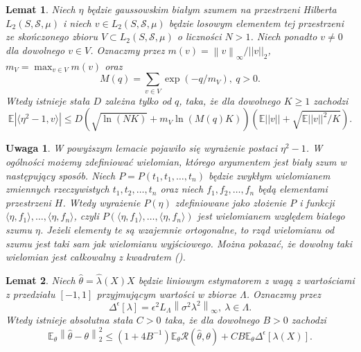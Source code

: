 \documentclass{article}
\newtheorem{lm}{Lemat}
\newtheorem{uw}{Uwaga}
\newcommand{\norm}[1]{\left\lVert#1\right\rVert}
\begin{document}
\begin{lm}\label{lem5}
Niech $\eta$ będzie gaussowskim białym szumem na przestrzeni Hilberta $L_2(S,\mathcal{S},\mu)$ i niech $v\in L_2(S,\mathcal{S},\mu)$ będzie losowym elementem tej przestrzeni ze skończonego zbioru $V\subset L_2(S,\mathcal{S},\mu)$ o liczności $N>1$. Niech ponadto $v\neq 0$ dla dowolnego $v\in V$. Oznaczmy przez $m(v)=\norm{v}_{\infty}/||v||_2$, $m_V=\max_{v\in V}m(v)$ oraz 
\begin{displaymath}
M(q)=\sum_{v\in V}\exp (-q/m_V),\ q>0.
\end{displaymath}
Wtedy istnieje stała $D$ zależna tylko od $q$, taka, że dla dowolnego $K\geq 1$ zachodzi
\begin{displaymath}
\mathbb{E}\left|\langle \eta^2-1, v\rangle\right|\leq D\left(\sqrt{\ln (NK)}+m_V\ln (M(q)K)\right)\left(\mathbb{E}||v||+\sqrt{\mathbb{E}||v||^2/K}\right).
\end{displaymath}
\end{lm}
\begin{uw}
W powyższym lemacie pojawiło się wyrażenie postaci $\eta^2-1$. W ogólności możemy zdefiniować wielomian, którego argumentem jest biały szum w następujący sposób. Niech $P=P(t_1,t_1,\dots, t_n)$ będzie zwykłym wielomianem zmiennych rzeczywistych $t_1,t_2,\dots, t_n$ oraz niech $f_1,f_2,\dots, f_n$ będą elementami przestrzeni $H$. Wtedy wyrażenie $P(\eta)$ zdefiniowane jako złożenie $P$ i funkcji $\langle \eta ,f_1\rangle, \dots , \langle 
\eta , f_n\rangle $, czyli $P(\langle \eta ,f_1\rangle, \dots , \langle 
\eta , f_n\rangle)$ jest wielomianem względem białego szumu $\eta$. Jeżeli elementy te są  wzajemnie ortogonalne, to rząd wielomianu od szumu jest taki sam jak wielomianu wyjściowego. Można pokazać, że dowolny taki wielomian jest całkowalny z kwadratem (\cite{hida}).
\end{uw}
\begin{lm}\label{lem6}
Niech $\hat{\theta}=\hat{\lambda}(X)X$ będzie liniowym estymatorem z wagą z wartościami z przedziału $[-1,1]$ przyjmującym wartości w zbiorze $\Lambda$. Oznaczmy przez 
\begin{displaymath}
\Delta^{\epsilon}[\lambda]=\epsilon^2L_{\Lambda}\norm{\sigma^2\lambda^2}_{\infty},\ \lambda\in \Lambda.
\end{displaymath}
Wtedy istnieje absolutna stała $C>0$ taka, że dla dowolnego $B>0$ zachodzi
\begin{displaymath}
\mathbb{E}_{\theta}\norm{\hat{\theta}-\theta}_2^2\leq (1+4B^{-1})\mathbb{E}_{\theta}\mathcal{R}(\hat{\theta},\theta)+CB\mathbb{E}_{\theta}\Delta^{\epsilon}[\lambda (X)].
\end{displaymath}
\end{lm}
\end{document}
